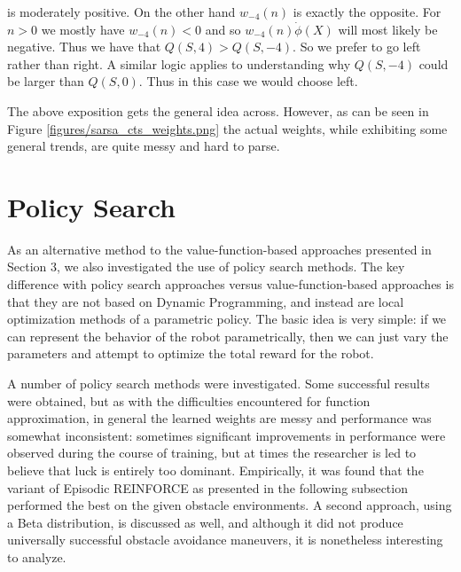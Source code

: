 \documentclass{article}
\begin{document}
is moderately positive. On the other hand $w_{-4}(n)$ is exactly the opposite. For $n > 0$ we mostly have $w_{-4}(n) < 0$ and so $w_{-4}(n) \dot \phi(X)$ will most likely be negative. Thus we have that $Q(S,4) > Q(S, -4)$. So we prefer to go left rather than right. A similar logic applies to understanding why $Q(S,-4)$ could be larger than $Q(S,0)$. Thus in this case we would choose left. 

The above exposition gets the general idea across. However, as can be seen in Figure \ref{figures/sarsa_cts_weights.png} the actual weights, while exhibiting some general trends, are quite messy and hard to parse.

%
%







\section{Policy Search}

As an alternative method to the value-function-based approaches presented in Section 3, we also investigated the use of policy search methods.  The key difference with policy search approaches versus value-function-based approaches is that they are not based on Dynamic Programming, and instead are local optimization methods of a parametric policy.  The basic idea is very simple: if we can represent the behavior of the robot parametrically, then we can just vary the parameters and attempt to optimize the total reward for the robot.

A number of policy search methods were investigated.  Some successful results were obtained, but as with the difficulties encountered for function approximation, in general the learned weights are messy and performance was somewhat inconsistent: sometimes significant improvements in performance were observed during the course of training, but at times the researcher is led to believe that luck is entirely too dominant.  Empirically, it was found that the variant of Episodic REINFORCE as presented in the following subsection performed the best on the given obstacle environments.  A second approach, using a Beta distribution, is discussed as well, and although it did not produce universally successful obstacle avoidance maneuvers, it is nonetheless interesting to analyze.
\end{document}
